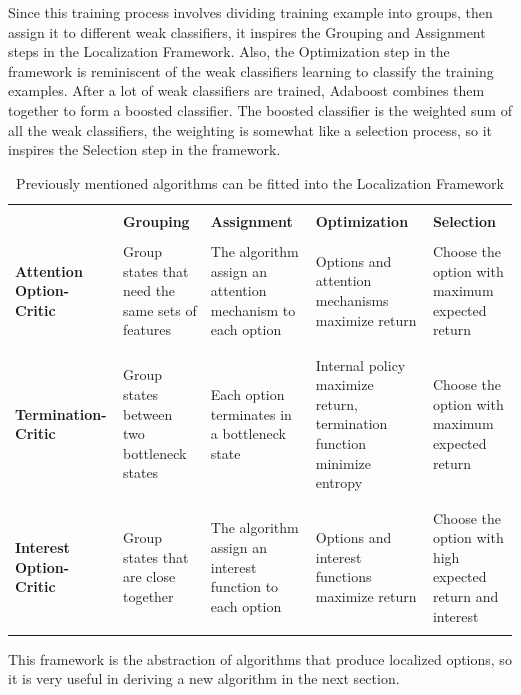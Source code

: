 \documentclass{article}
\begin{document}
	\quad Since this training process involves dividing training example into groups, then assign it to different weak classifiers, it inspires the Grouping and Assignment steps in the Localization Framework. Also, the Optimization step in the framework is reminiscent of the weak classifiers learning to classify the training examples. After a lot of weak classifiers are trained, Adaboost combines them together to form a boosted classifier. The boosted classifier is the weighted sum of all the weak classifiers, the weighting is somewhat like a selection process, so it inspires the Selection step in the framework.
	\begin{table}[H]
		\begin{center}
			\begin{tabular}{|p{23mm}||p{30mm}|p{30mm}|p{30mm}|p{30mm}|}
				\hline
				&&&&\\
				&\centering \bfseries Grouping&\centering \bfseries Assignment&\centering \bfseries Optimization&\bfseries \hspace{0.25in} Selection \\
				\hline\hline
				&&&&\\
				\bfseries Attention Option-Critic&\small Group states that need the same sets of features&\small The algorithm assign an attention mechanism to each option&\small Options and attention mechanisms maximize return &\small Choose the option with maximum expected return\\
				&&&&\\
				\hline
				&&&&\\
				\bfseries Termination-Critic&\small Group states between two bottleneck states&\small Each option terminates in a bottleneck state&\small Internal policy maximize return, termination function minimize entropy&\small Choose the option with maximum expected return\\
				&&&&\\
				\hline
				&&&&\\
				\bfseries Interest Option-Critic&\small Group states that are close together&\small The algorithm assign an interest function to each option&\small Options and interest functions maximize return &\small Choose the option with high expected return and interest\\
				&&&&\\
				\hline
			\end{tabular}
			\caption{Previously mentioned algorithms can be fitted into the Localization Framework}
		\end{center}
	\end{table}
	This framework is the abstraction of algorithms that produce localized options, so it is very useful in deriving a new algorithm in the next section.
\end{document}
